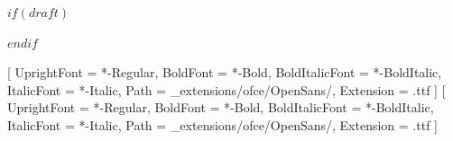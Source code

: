 \usepackage{titlepic}
\usepackage{titling}
\usepackage{graphicx}
\usepackage{fontspec}
\usepackage{placeins}
\usepackage{graphbox}
\usepackage{tikz}
\usepackage{geometry}
\usepackage{xcolor}
\usepackage{amsmath}
\usepackage[some]{background}
$if(draft)$
\usepackage[stamp,color=red!10]{draftwatermark}
$endif$
\usepackage{lipsum}
\usepackage{caption}
\usepackage{datetime}
\usepackage{xstring}
\usepackage{blindtext}
\usepackage{scrlayer-scrpage}

\setmainfont{OpenSans}[
  UprightFont = {*-Regular},
  BoldFont = {*-Bold},
  BoldItalicFont = {*-BoldItalic},
  ItalicFont = {*-Italic},
  Path = {_extensions/ofce/OpenSans/},
  Extension = {.ttf}
]
\setsansfont{OpenSans}[
  UprightFont = {*-Regular},
  BoldFont = {*-Bold},
  BoldItalicFont = {*-BoldItalic},
  ItalicFont = {*-Italic},
  Path = {_extensions/ofce/OpenSans/},
  Extension = {.ttf}
]

\def\getYear#1{\StrLeft{#1}{4}}
\def\getMonth#1{\StrMid{#1}{6}{7}}
\def\getDay#1{\StrRight{#1}{2}}

\def\jolimois#1{\monthname{\getMonth{#1}}}


\clearpairofpagestyles


\pagestyle{scrheadings}

\lofoot*{\thepage}
